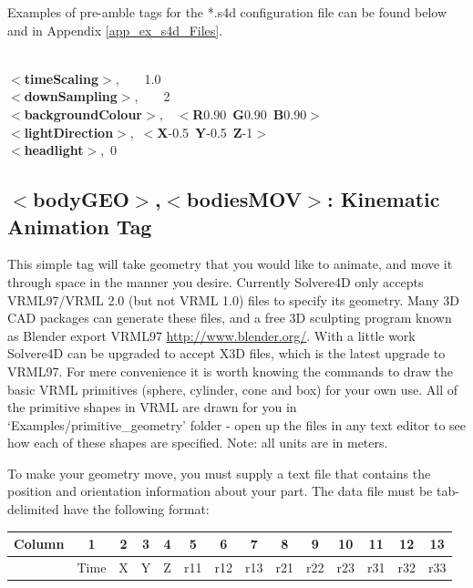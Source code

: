 \documentclass[singlecolumn,12pt]{article}
\newcommand{\hlstd}[1]{\textcolor[rgb]{0,0,0}{#1}}
\newcommand{\hlkey}[1]{\textcolor[rgb]{0,0,1}{\bf{#1}}}
\newcommand{\hlnum}[1]{\textcolor[rgb]{0.66,0,0.66}{#1}}
\begin{document}
\vspace{1cm}

 Examples of pre-amble tags for the *.s4d configuration
file can be found below and in Appendix \ref{app_ex_s4d_Files}.

\vspace{1cm}

\hlnum{\\
}\hlkey{$<$timeScaling$>$}\hlstd{,\hlstd{\ \ \ \ }}\hlnum{1.0\\
}\hlstd{}\hlkey{$<$downSampling$>$}\hlstd{,\hlstd{\ \ \ \ }}\hlnum{2\\
}\hlstd{}\hlkey{$<$backgroundColour$>$}\hlstd{,\hlstd{\ \ }}\hlkey{$<$R}\hlnum{0.90\ }\hlkey{G}\hlnum{0.90\ }\hlkey{B}\hlnum{0.90}\hlkey{$>$}\hlstd{\\
}\hlkey{$<$lightDirection$>$}\hlstd{,\ }\hlkey{$<$X}\hlnum{-0.5\ }\hlkey{Y}\hlnum{-0.5\ }\hlkey{Z}\hlnum{-1}\hlkey{$>$}\hlstd{\\
}\hlkey{$<$headlight$>$}\hlstd{,\ }\hlnum{0}

\vspace{1cm}

\subsection{$<$bodyGEO$>$,$<$bodiesMOV$>$: Kinematic Animation Tag}

This simple tag will take geometry that you would like to animate,
and move it through space in the manner you desire. Currently
Solvere4D only accepts VRML97/VRML 2.0 (but not VRML 1.0) files to
specify its geometry. Many 3D CAD packages can generate these files,
and a free 3D sculpting program known as Blender export VRML97
\url{http://www.blender.org/}. With a little work Solvere4D can be
upgraded to accept X3D files, which is the latest upgrade to VRML97.
For mere convenience it is worth knowing the commands to draw the
basic VRML primitives (sphere, cylinder, cone and box) for your own
use. All of the primitive shapes in VRML are drawn for you in
`Examples/primitive\_geometry' folder - open up the files in any
text editor to see how each of these shapes are specified. Note: all
units are in meters.

To make your geometry move, you must supply a text file that
contains the position and orientation information about your part.
The data file must be tab-delimited have the following format:

\vspace{1cm}
\begin{center}
\begin{tabular}{c|c|c|c|c|c|c|c|c|c|c|c|c|c|}
\hline Column & 1 & 2 & 3 & 4 & 5 & 6 & 7 & 8 & 9 & 10 & 11 & 12 & 13 \\
\hline & Time & X & Y & Z & r11 & r12 & r13 & r21 & r22 & r23 & r31
& r32 &
r33 \\
\end{tabular}
\end{center}
\vspace{1cm}
\end{document}
